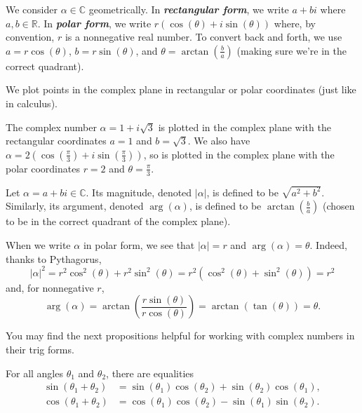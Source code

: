 \documentclass{article}
\begin{document}
We consider $\alpha \in \mathbb{C}$ geometrically. In \textbf{\textit{rectangular form}}, we write $a+bi$ where $a, b \in \mathbb{R}$.  In \textbf{\textit{polar form}}, we write $r(\cos(\theta) + i \sin(\theta))$ where, by convention, $r$ is a nonnegative real number.  To convert back and forth, we use $a = r \cos(\theta)$, $b = r \sin(\theta)$, and $\theta = \arctan(\frac{b}{a})$ (making sure we're in the correct quadrant).

\begin{example*} We plot points in the complex plane in rectangular or polar coordinates (just like in calculus).

\begin{minipage}{.2 \textwidth}
\scalebox{.7}{}
\end{minipage}
\hfill
\begin{minipage}{.75\textwidth}
The complex number $\alpha = 1+i\sqrt{3}$ is plotted in the complex plane with the rectangular coordinates $a = 1$ and $b = \sqrt{3}$.  We also have $\alpha = 2 (\cos(\frac{\pi}{3}) + i \sin(\frac{\pi}{3}))$, so is plotted in the complex plane with the polar coordinates $r = 2$ and $\theta = \frac{\pi}{3}$.
\end{minipage}
\end{example*}

\begin{defn*} Let $\alpha = a+bi \in \mathbb{C}$.  Its magnitude, denoted $|\alpha|$, is defined to be $\sqrt{a^2 + b^2}$.  Similarly, its argument, denoted $\arg(\alpha)$, is defined to be $\arctan \left(\frac{b}{a}\right)$ (chosen to be in the correct quadrant of the complex plane).

When we write $\alpha$ in polar form, we see that $|\alpha| = r$ and $\arg(\alpha) = \theta$.  Indeed, thanks to Pythagorus, \[
|\alpha|^2 = r^2 \cos^2(\theta) + r^2 \sin^2(\theta) = r^2(\cos^2(\theta) + \sin^2(\theta)) = r^2\]
and, for nonnegative $r$, 
\[\arg(\alpha) = \arctan\left(\frac{r\sin(\theta)}{r\cos(\theta)}\right) = \arctan(\tan(\theta)) = \theta.\]
\end{defn*}

You may find the next propositions helpful for working with complex numbers in their trig forms.

\begin{prop*} For all angles $\theta_1$ and $\theta_2$, there are equalities
\begin{align*} \sin(\theta_1 + \theta_2) &= \sin(\theta_1)\cos(\theta_2) + \sin(\theta_2)\cos(\theta_1), \\
                \cos(\theta_1 + \theta_2) &= \cos(\theta_1)\cos(\theta_2) - \sin(\theta_1)\sin(\theta_2).
                \end{align*}
\end{prop*}
\end{document}
